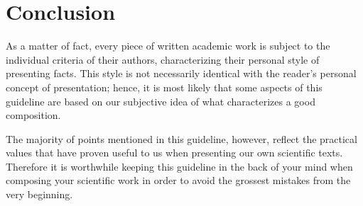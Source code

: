 \chapter{Conclusion}

As a matter of fact, every piece of written academic work is subject
to the individual criteria of their authors, characterizing their personal 
style of presenting facts. This style is not necessarily identical with the 
reader's personal concept of presentation; hence, it is most likely that some 
aspects of this guideline are based on our subjective idea of what 
characterizes a good composition. 

The majority of points mentioned in this guideline, however, reflect the 
practical values that have proven useful to us when presenting our own 
scientific texts. Therefore it is worthwhile keeping this guideline in the 
back of your mind when composing your scientific work in order to avoid the 
grossest mistakes from the very beginning.

